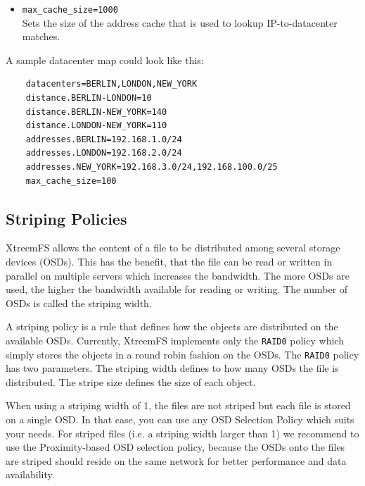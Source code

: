 \documentclass[a4paper,10pt]{book}
\begin{document}
\begin{itemize}
\begin{itemize}
		\item \texttt{max\_cache\_size=1000}\\
			Sets the size of the address cache that is used to lookup IP-to-datacenter matches.
	\end{itemize}
	
	A sample datacenter map could look like this:

	\begin{verbatim}
	datacenters=BERLIN,LONDON,NEW_YORK
	distance.BERLIN-LONDON=10
	distance.BERLIN-NEW_YORK=140
	distance.LONDON-NEW_YORK=110
	addresses.BERLIN=192.168.1.0/24
	addresses.LONDON=192.168.2.0/24
	addresses.NEW_YORK=192.168.3.0/24,192.168.100.0/25
	max_cache_size=100
	\end{verbatim}


\end{itemize}



\subsection{Striping Policies} \label{sec:striping_policies}

XtreemFS allows the content of a file to be distributed among several storage devices (OSDs). This has the benefit, that the file can be read or written in parallel on multiple servers which increases the bandwidth. The more OSDs are used, the higher the bandwidth available for reading or writing. The number of OSDs is called the striping width.

A striping policy is a rule that defines how the objects are distributed on the available OSDs. Currently, XtreemFS implements only the \texttt{RAID0} policy which simply stores the objects in a round robin fashion on the OSDs. The \texttt{RAID0} policy has two parameters. The striping width defines to how many OSDs the file is distributed. The stripe size defines the size of each object.

When using a striping width of 1, the files are not striped but each file is stored on a single OSD. In that case, you can use any OSD Selection Policy which suits your needs. For striped files (i.e. a striping width larger than 1) we recommend to use the Proximity-based OSD selection policy, because the OSDs onto the files are striped should reside on the same network for better performance and data availability.
\end{document}
